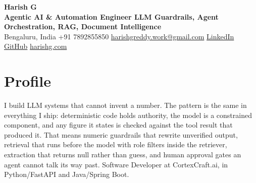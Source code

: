 \documentclass[10pt,a4paper]{article}
\begin{document}
{\LARGE\bfseries Harish G}\\[1pt]
{\small\bfseries Agentic AI \& Automation Engineer \textbar{} LLM Guardrails, Agent Orchestration, RAG, Document Intelligence}\\[2pt]
{\small Bengaluru, India \quad\textbar\quad +91 7892855850 \quad\textbar\quad
\href{mailto:harishgreddy.work@gmail.com}{harishgreddy.work@gmail.com} \quad\textbar\quad
\href{https://www.linkedin.com/in/harishgreddy/}{LinkedIn} \quad\textbar\quad \href{https://github.com/harish00506/}{GitHub} \quad\textbar\quad \href{https://www.harishg.com}{harishg.com}}

\section{Profile}
I build LLM systems that cannot invent a number. The pattern is the same in everything I ship:
deterministic code holds authority, the model is a constrained component, and any figure it states is
checked against the tool result that produced it. That means numeric guardrails that rewrite
unverified output, retrieval that runs before the model with role filters inside the retriever,
extraction that returns null rather than guess, and human approval gates an agent cannot talk its way
past. Software Developer at CortexCraft.ai, in Python/FastAPI and Java/Spring Boot.

\end{document}
